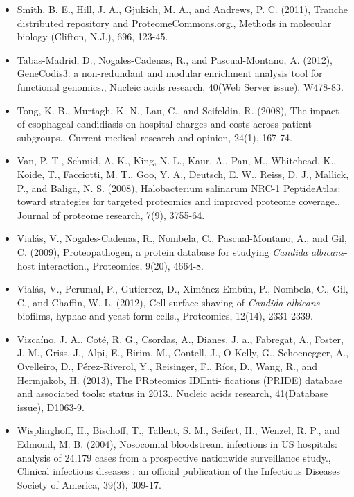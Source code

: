 \begin{itemize}[leftmargin=*]
\item[]{
Smith, B. E., Hill, J. A., Gjukich, M. A., and Andrews, P. C. (2011), Tranche 
distributed repository and ProteomeCommons.org., Methods in molecular biology (Clifton, N.J.), 696,
123-45.
}

\item[]{
Tabas-Madrid, D., Nogales-Cadenas, R., and Pascual-Montano, A. (2012), GeneCodis3: a
non-redundant and modular enrichment analysis tool for functional genomics., Nucleic acids
research, 40(Web Server issue), W478-83.
}

\item[]{
Tong, K. B., Murtagh, K. N., Lau, C., and Seifeldin, R. (2008), The impact of esophageal 
candidiasis on hospital charges and costs across patient subgroups., Current medical research
and opinion, 24(1), 167-74.
}

\item[]{
Van, P. T., Schmid, A. K., King, N. L., Kaur, A., Pan, M., Whitehead, K., Koide, T., Facciotti,
M. T., Goo, Y. A., Deutsch, E. W., Reiss, D. J., Mallick, P., and Baliga, N. S. (2008), 
Halobacterium salinarum NRC-1 PeptideAtlas: toward strategies for targeted proteomics and
improved proteome coverage., Journal of proteome research, 7(9), 3755-64.
}

\item[]{
Vial\'as, V., Nogales-Cadenas, R., Nombela, C., Pascual-Montano, A., and Gil, C. (2009), 
Proteopathogen, a protein database for studying \textit{Candida albicans}-host interaction., 
Proteomics, 9(20), 4664-8.
}

\item[]{
Vial\'as, V., Perumal, P., Gutierrez, D., Xim\'enez-Emb\'un, P., Nombela, C., Gil, C., and Chaffin,
W. L. (2012), Cell surface shaving of \textit{Candida albicans} biofilms, hyphae and yeast form
cells., Proteomics, 12(14), 2331-2339.
}

\item[]{
Vizca\'ino, J. A., Cot\'e, R. G., Csordas, A., Dianes, J. a., Fabregat, A., Foster, J. M., Griss, J.,
Alpi, E., Birim, M., Contell, J., O Kelly, G., Schoenegger, A., Ovelleiro, D., P\'erez-Riverol,
Y., Reisinger, F., R\'ios, D., Wang, R., and Hermjakob, H. (2013), The PRoteomics IDEnti-
fications (PRIDE) database and associated tools: status in 2013., Nucleic acids research,
41(Database issue), D1063-9.
}

\item[]{
Wisplinghoff, H., Bischoff, T., Tallent, S. M., Seifert, H., Wenzel, R. P., and Edmond, M. B.
(2004), Nosocomial bloodstream infections in US hospitals: analysis of 24,179 cases from
a prospective nationwide surveillance study., Clinical infectious diseases : an official 
publication of the Infectious Diseases Society of America, 39(3), 309-17.
}



\end{itemize}
